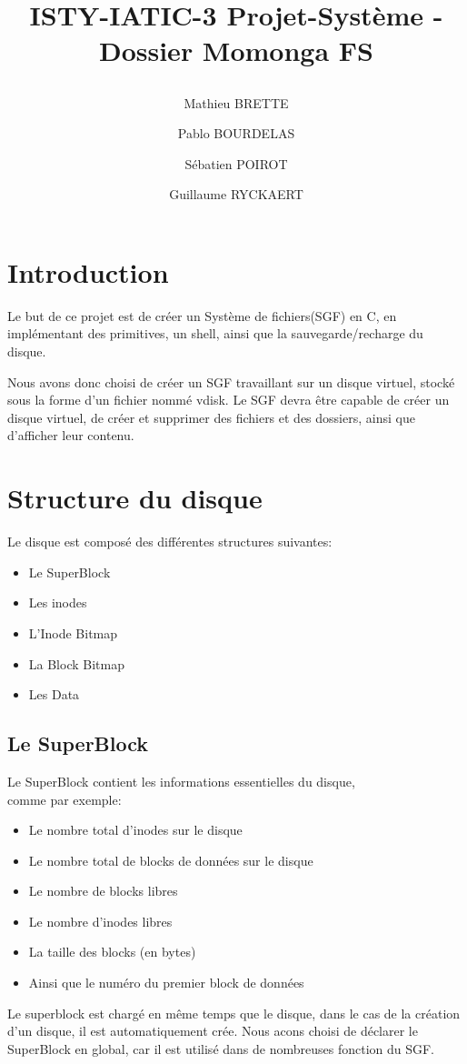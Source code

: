 \documentclass{report}
\begin{document}
\onehalfspacing
\title{%
    \begin{minipage}\linewidth
        \centering
        ISTY-IATIC-3
        \vskip 3pt
        \large Projet-Système - Dossier Momonga FS
    \author{Mathieu BRETTE \and Pablo BOURDELAS \and Sébatien POIROT\and Guillaume RYCKAERT}
    \end{minipage}
 }
 \maketitle

 \section*{Introduction}

 Le but de ce projet est de créer un Système de fichiers(SGF) en C, en implémentant des primitives, un shell, ainsi que la sauvegarde/recharge du disque.

Nous avons donc choisi de créer un SGF travaillant sur un disque virtuel, stocké sous la forme d'un fichier nommé vdisk. Le SGF devra être capable de créer un disque virtuel, de créer et supprimer des fichiers et des dossiers, ainsi que d'afficher leur contenu.
\newpage

\section*{Structure du disque}
Le disque est composé des différentes structures suivantes:
\begin{itemize}
\item Le SuperBlock
\item Les inodes
\item L'Inode Bitmap
\item La Block Bitmap
\item Les Data
\end{itemize}

\subsection*{Le SuperBlock}
Le SuperBlock contient les informations essentielles du disque,\\comme par exemple: 
\begin{itemize}
\item Le nombre total d'inodes sur le disque
\item Le nombre total de blocks de données sur le disque
\item Le nombre de blocks libres
\item Le nombre d'inodes libres
\item La taille des blocks (en bytes)
\item Ainsi que le numéro du premier block de données
\end{itemize}
Le superblock est chargé en même temps que le disque, dans le cas de la création d'un disque, il est automatiquement crée. Nous acons choisi de déclarer le SuperBlock en global, car il est utilisé dans de nombreuses fonction du SGF.
\end{document}
